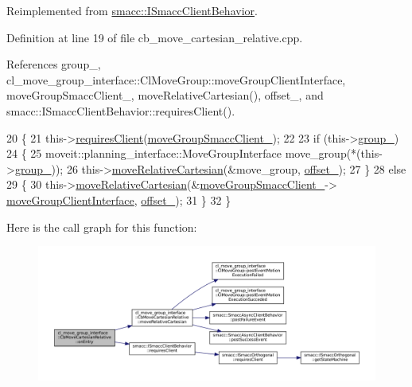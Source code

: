 Reimplemented from \hyperlink{classsmacc_1_1ISmaccClientBehavior_a9877684b1954429719826e2d0924d980}{smacc\+::\+I\+Smacc\+Client\+Behavior}.



Definition at line 19 of file cb\+\_\+move\+\_\+cartesian\+\_\+relative.\+cpp.



References group\+\_\+, cl\+\_\+move\+\_\+group\+\_\+interface\+::\+Cl\+Move\+Group\+::move\+Group\+Client\+Interface, move\+Group\+Smacc\+Client\+\_\+, move\+Relative\+Cartesian(), offset\+\_\+, and smacc\+::\+I\+Smacc\+Client\+Behavior\+::requires\+Client().


\begin{DoxyCode}
20 \{
21   this->\hyperlink{classsmacc_1_1ISmaccClientBehavior_a32b16e99e3b4cb289414203dc861a440}{requiresClient}(\hyperlink{classcl__move__group__interface_1_1CbMoveCartesianRelative_ac0226b2db9bf4de86eb64a535457e295}{moveGroupSmaccClient\_});
22 
23   \textcolor{keywordflow}{if} (this->\hyperlink{classcl__move__group__interface_1_1CbMoveCartesianRelative_a194d8357267ccd5ee0a10200f1c4cae0}{group\_})
24   \{
25       moveit::planning\_interface::MoveGroupInterface move\_group(*(this->\hyperlink{classcl__move__group__interface_1_1CbMoveCartesianRelative_a194d8357267ccd5ee0a10200f1c4cae0}{group\_}));
26       this->\hyperlink{classcl__move__group__interface_1_1CbMoveCartesianRelative_ae8443c7f81affe5c4450e83fc665487f}{moveRelativeCartesian}(&move\_group, \hyperlink{classcl__move__group__interface_1_1CbMoveCartesianRelative_aac5b6c2f42406da43f94cd5334aca925}{offset\_});
27   \}
28   \textcolor{keywordflow}{else}
29   \{
30       this->\hyperlink{classcl__move__group__interface_1_1CbMoveCartesianRelative_ae8443c7f81affe5c4450e83fc665487f}{moveRelativeCartesian}(&\hyperlink{classcl__move__group__interface_1_1CbMoveCartesianRelative_ac0226b2db9bf4de86eb64a535457e295}{moveGroupSmaccClient\_}->
      \hyperlink{classcl__move__group__interface_1_1ClMoveGroup_a92922ea689e4e1b7b91512c56629c95b}{moveGroupClientInterface}, \hyperlink{classcl__move__group__interface_1_1CbMoveCartesianRelative_aac5b6c2f42406da43f94cd5334aca925}{offset\_});
31   \}
32 \}
\end{DoxyCode}
Here is the call graph for this function\+:
\nopagebreak
\begin{figure}[H]
\begin{center}
\leavevmode
\includegraphics[width=350pt]{classcl__move__group__interface_1_1CbMoveCartesianRelative_a7d65e3d5fa3f2c7b47d9cbe631f448ad_cgraph}
\end{center}
\end{figure}
